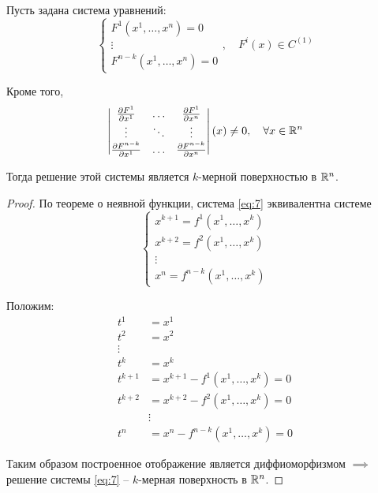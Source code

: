 \begin{statement}
    Пусть задана система уравнений:
    \begin{equation}\label{eq:7}
        \left\{\begin{array}{l}
            F^1(x^1,\ldots,x^n) = 0 \\
            \vdots                  \\
            F^{n-k}(x^1,\ldots,x^n) = 0
        \end{array}\right.,\quad F^i(x)\in C^{(1)}
    \end{equation}

    Кроме того,
    \[
        \left|\begin{matrix}
            \frac{\partial F^1}{\partial x^1}     & \ldots & \frac{\partial F^1}{\partial x^n}     \\
            \vdots                            & \ddots & \vdots                            \\
            \frac{\partial F^{n-k}}{\partial x^1} & \ldots & \frac{\partial F^{n-k}}{\partial x^n}
        \end{matrix}\right|(x) \ne 0, \quad \forall x \in \mathbb{R}^n
    \]

    Тогда решение этой системы является $k$-мерной поверхностью в $\mathbb{R}^n$.
\end{statement}

\begin{proof}
    По теореме о неявной функции, система \ref{eq:7} эквивалентна системе
    \[
        \left\{\begin{array}{l}
            x^{k+1} = f^1(x^1,\ldots,x^k) \\
            x^{k+2} = f^2(x^1,\ldots,x^k) \\
            \vdots                        \\
            x^n = f^{n-k}(x^1,\ldots,x^k)
        \end{array}\right.
    \]

    Положим:
    \begin{align*}
        t^1     & = x^1                               \\
        t^2     & = x^2                               \\
        \vdots                                        \\
        t^k     & = x^k                               \\
        t^{k+1} & = x^{k+1} - f^1(x^1,\ldots,x^k) = 0 \\
        t^{k+2} & = x^{k+2} - f^2(x^1,\ldots,x^k) = 0 \\
                & \vdots                              \\
        t^{n}   & = x^n - f^{n-k}(x^1,\ldots,x^k) = 0
    \end{align*}

    Таким образом построенное отображение является диффиоморфизмом $\implies$ решение системы \ref{eq:7} -- $k$-мерная поверхность в $\mathbb{R}^n$.
\end{proof}

